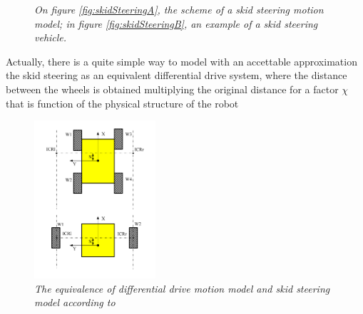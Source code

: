 \begin{figure}
	\centering
	\qquad
	\caption{\textit{On figure \ref{fig:skidSteeringA}, the scheme of a skid steering motion model; in figure \ref{fig:skidSteeringB}, an example of a skid steering vehicle.}}
	\label{fig:skidSteering}
\end{figure}

Actually, there is a quite simple way  \parencite{skid2diff} to model with an accettable approximation the skid steering as an equivalent differential drive system, where the distance between the wheels is obtained multiplying the original distance for a factor $\chi$ that is function of the physical structure of the robot

\begin{figure}
	\centering
	\includegraphics[width=0.4\textwidth]{Images/background_and_tools/diffSkidEquivalence.png}
	\caption{\textit{The equivalence of differential drive motion model and skid steering model according to \cite{skid2diff}}}
	\label{fig:husky}
\end{figure}

